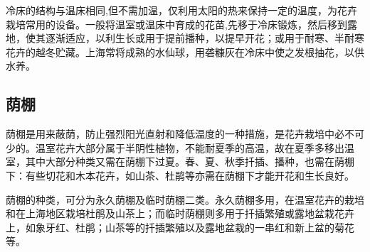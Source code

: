 \documentclass{ctexbook}
\begin{document}
冷床的结构与温床相同,但不需加温，仅利用太阳的热来保持一定的温度，为花卉栽培常用的设备。一般将温室或温床中育成的花苗,先移于冷床锻炼，然后移到露地，使其逐渐适应，以利生长或用于提前播种，以提早开花；或用于耐寒、半耐寒花卉的越冬贮藏。上海常将成熟的水仙球，用砻糠灰在冷床中使之发根抽花，以供水养。
\subsection{荫棚}
荫棚是用来蔽荫，防止强烈阳光直射和降低温度的一种措施，是花卉栽培中必不可少的。温室花卉大部分属于半阴性植物，不能耐夏季的高温，故在夏季多移出温室，其中大部分种类又需在荫棚下过夏。春、夏、秋季扦插、播种，也需在荫棚下：有些切花和木本花卉，如山茶、杜鹃等亦需在荫棚下才能开花和生长良好。

荫棚的种类，可分为永久荫棚及临时荫棚二类。永久荫棚多用，在温室花卉的栽培和在上海地区栽培杜鹃及山茶上；而临时荫棚则多用于扦插繁殖或露地盆栽花卉上，如象牙红、杜鹃；山茶等的扦插繁殖以及露地盆栽的一串红和新上盆的菊花等。
\end{document}
